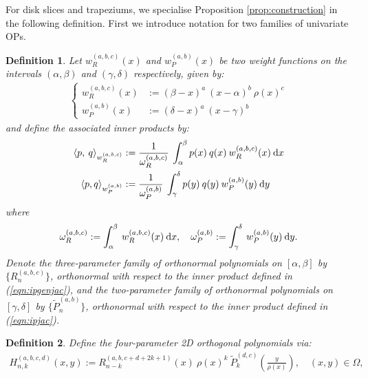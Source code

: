 \documentclass[11pt, oneside]{article}   	%
\newcommand{\hdop}{H}
\newcommand{\hdopnk}{\hdop_{n,k}}
\newcommand{\jac}{{\tilde P}}
\newcommand{\genjac}{R}
\newcommand{\genjacnmk}{\genjac_{n-k}}
\newcommand{\genjacw}{w_\genjac}
\newcommand{\jacw}{w_P}
\newcommand{\normgenjac}{\omega_\genjac}
\newcommand{\normjac}{\omega_P}
\newtheorem{definition}{Definition}
\begin{document}
For disk slices and trapeziums, we specialise Proposition \ref{prop:construction} in the following definition. First we introduce notation for two families of univariate OPs.
\begin{definition}\label{def:OPconstruction}
Let $\genjacw^{(a,b,c)}(x)$ and $\jacw^{(a,b)}(x)$ be two weight functions on the intervals $(\alpha, \beta)$ and $(\gamma, \delta)$ respectively, given by:
\begin{align*}
\begin{cases}
\genjacw^{(a,b,c)}(x) &:= (\beta - x)^a \: (x - \alpha)^{b} \: \rho(x)^{c} \\
\jacw^{(a,b)}(x) &:= (\delta-x)^a \: (x - \gamma)^b
\end{cases}
\end{align*}
and define the associated inner products by:
\begin{align}
	\ip< p, \: q >_{\genjacw^{(a,b,c)}} &:= \frac{1}{\normgenjac^{(a,b,c)}} \: \int_\alpha^\beta p(x) \: q(x) \: \genjacw^{(a,b,c)}(x) \: \D x \label{eqn:ipgenjac} \\
	\ip<p, q>_{\jacw^{(a,b)}} &:= \frac{1}{\normjac^{(a,b)}} \: \int_\gamma^\delta p(y) \: q(y) \: \jacw^{(a,b)}(y)\: \D y \label{eqn:ipjac}
\end{align}
where
\begin{align}
	\normgenjac^{(a,b,c)} := \int_\alpha^\beta \: \genjacw^{(a,b,c)}(x) \: \D x, \quad \normjac^{(a,b)} := \int_\gamma^\delta \: \jacw^{(a,b)}(y) \: \D y. \label{eqn:ipnormalisations}
\end{align}
Denote the three-parameter family of orthonormal polynomials on $[\alpha,\beta]$ by $\{\genjac_n^{(a,b,c)}\}$, orthonormal with respect to the inner product defined in (\ref{eqn:ipgenjac}), and the two-parameter family of orthonormal polynomials on $[\gamma,\delta]$ by $\{\jac_n^{(a,b)}\}$, orthonormal with respect to the inner product defined in (\ref{eqn:ipjac}).
\end{definition}

\begin{definition}\label{def:constuction}
Define the four-parameter 2D orthogonal polynomials via:
\begin{align*}
	\hdopnk^{(a,b,c,d)}(x,y) := \genjacnmk^{(a, b, c+d+2k+1)}(x) \: \rho(x)^k \: \jac_k^{(d,c)}(\frac{y}{\rho(x)}), \quad (x,y) \in \Omega, 
\end{align*}
\end{definition}
\end{document}
